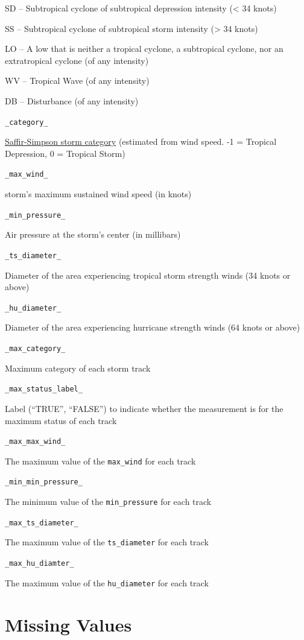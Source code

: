 \documentclass[]{book}
\begin{document}
SD -- Subtropical cyclone of subtropical depression intensity (\textless{} 34 knots)

SS -- Subtropical cyclone of subtropical storm intensity (\textgreater{} 34 knots)

LO -- A low that is neither a tropical cyclone, a subtropical cyclone, nor an extratropical cyclone (of any intensity)

WV -- Tropical Wave (of any intensity)

DB -- Disturbance (of any intensity)

\texttt{\_category\_}

\href{https://www.nhc.noaa.gov/aboutsshws.php}{Saffir-Simpson storm category} (estimated from wind speed. -1 = Tropical Depression, 0 = Tropical Storm)

\texttt{\_max\_wind\_}

storm's maximum sustained wind speed (in knots)

\texttt{\_min\_pressure\_}

Air pressure at the storm's center (in millibars)

\texttt{\_ts\_diameter\_}

Diameter of the area experiencing tropical storm strength winds (34 knots or above)

\texttt{\_hu\_diameter\_}

Diameter of the area experiencing hurricane strength winds (64 knots or above)

\texttt{\_max\_category\_}

Maximum category of each storm track

\texttt{\_max\_status\_label\_}

Label (``TRUE'', ``FALSE'') to indicate whether the measurement is for the maximum status of each track

\texttt{\_max\_max\_wind\_}

The maximum value of the \texttt{max\_wind} for each track

\texttt{\_min\_min\_pressure\_}

The minimum value of the \texttt{min\_pressure} for each track

\texttt{\_max\_ts\_diameter\_}

The maximum value of the \texttt{ts\_diameter} for each track

\texttt{\_max\_hu\_diamter\_}

The maximum value of the \texttt{hu\_diameter} for each track

\hypertarget{missingval}{%
\chapter{Missing Values}\label{missingval}}
\end{document}
